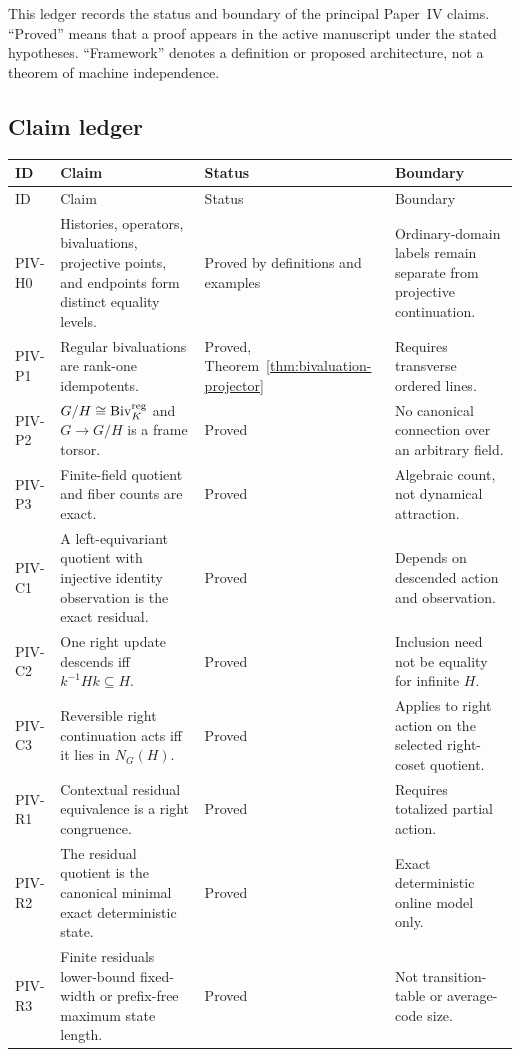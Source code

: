 This ledger records the status and boundary of the principal Paper~IV claims.
``Proved'' means that a proof appears in the active manuscript under the stated
hypotheses.  ``Framework'' denotes a definition or proposed architecture, not
a theorem of machine independence.

\subsection{Claim ledger}

\begingroup\setlength{\tabcolsep}{4pt}\begin{longtable}{L{0.10\textwidth}L{0.36\textwidth}L{0.13\textwidth}L{0.24\textwidth}}
\toprule
ID & Claim & Status & Boundary\\
\midrule
\endfirsthead
\toprule
ID & Claim & Status & Boundary\\
\midrule
\endhead
PIV-H0 & Histories, operators, bivaluations, projective points, and endpoints form distinct equality levels. & Proved by definitions and examples & Ordinary-domain labels remain separate from projective continuation.\\
PIV-P1 & Regular bivaluations are rank-one idempotents. & Proved, Theorem~\ref{thm:bivaluation-projector} & Requires transverse ordered lines.\\
PIV-P2 & $G/H\cong\operatorname{Biv}_K^{\mathrm{reg}}$ and $G\to G/H$ is a frame torsor. & Proved & No canonical connection over an arbitrary field.\\
PIV-P3 & Finite-field quotient and fiber counts are exact. & Proved & Algebraic count, not dynamical attraction.\\
PIV-C1 & A left-equivariant quotient with injective identity observation is the exact residual. & Proved & Depends on descended action and observation.\\
PIV-C2 & One right update descends iff $k^{-1}Hk\subseteq H$. & Proved & Inclusion need not be equality for infinite $H$.\\
PIV-C3 & Reversible right continuation acts iff it lies in $N_G(H)$. & Proved & Applies to right action on the selected right-coset quotient.\\
PIV-R1 & Contextual residual equivalence is a right congruence. & Proved & Requires totalized partial action.\\
PIV-R2 & The residual quotient is the canonical minimal exact deterministic state. & Proved & Exact deterministic online model only.\\
PIV-R3 & Finite residuals lower-bound fixed-width or prefix-free maximum state length. & Proved & Not transition-table or average-code size.\\

\end{longtable}
